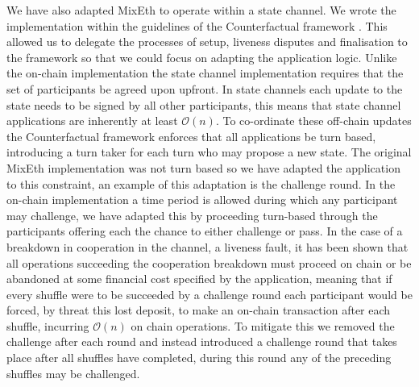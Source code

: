 \documentclass[a4paper,UKenglish,cleveref, autoref]{oasics-v2019}
\begin{document}
We have also adapted MixEth to operate within a state channel. We wrote the implementation within the guidelines of the Counterfactual framework \cite{coleman2018counterfactual}. This allowed us to delegate the processes of setup, liveness disputes and finalisation to the framework so that we could focus on adapting the application logic. Unlike the on-chain implementation the state channel implementation requires that the set of participants be agreed upon upfront. In state channels each update to the state needs to be signed by all other participants, this means that state channel applications are inherently at least $\mathcal{O}(n)$. To co-ordinate these off-chain updates the Counterfactual framework enforces that all applications be turn based, introducing a turn taker for each turn who may propose a new state. The original MixEth implementation was not turn based so we have adapted the application to this constraint, an example of this adaptation is the challenge round. In the on-chain implementation a time period is allowed during which any participant may challenge, we have adapted this by proceeding turn-based through the participants offering each the chance to either challenge or pass. In the case of a breakdown in cooperation in the channel, a liveness fault, it has been shown that all operations succeeding the cooperation breakdown must proceed on chain\cite{mccorryyou} or be abandoned at some financial cost specified by the application, meaning that if every shuffle were to be succeeded by a challenge round each participant would be forced, by threat this lost deposit, to make an on-chain transaction after each shuffle, incurring $\mathcal{O}(n)$ on chain operations. To mitigate this we removed the challenge after each round and instead introduced a challenge round that takes place after all shuffles have completed, during this round any of the preceding shuffles may be challenged.
\end{document}
